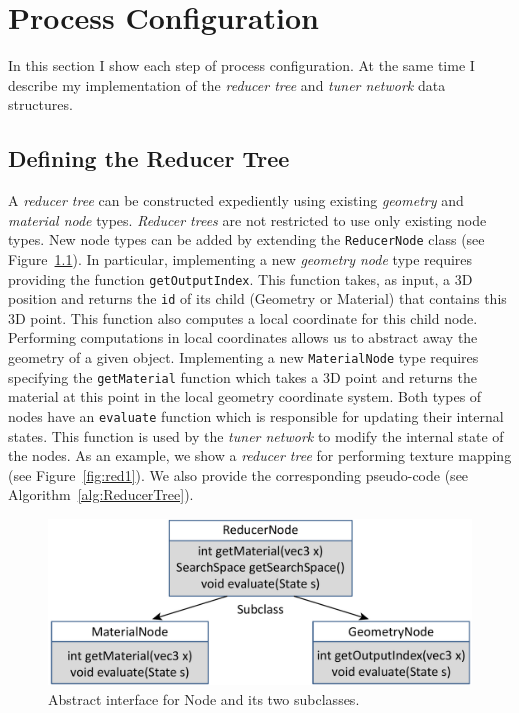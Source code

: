 \chapter{Process Configuration}
\label{sec:config}
In this section I show each step of process configuration. At the same time I describe my implementation of the 
\emph{reducer tree} and \emph{tuner network} data structures.

\section{Defining the Reducer Tree}
A \emph{reducer tree} can be constructed expediently using existing \emph{geometry} and \emph{material node} types.
\emph{Reducer trees} are not restricted to use only existing node types.
New node types can be added by extending the \verb|ReducerNode| class (see Figure~\ref{fig:node}).
In particular, implementing a new \emph{geometry node} type requires providing the function \verb|getOutputIndex|.
This function takes, as input, a 3D position and returns the \verb|id| of its child (Geometry or Material)
that contains this 3D point.
This function also computes a local coordinate for this child node.
Performing computations in local coordinates allows us to abstract away the geometry of a given object.
Implementing a new \verb|MaterialNode| type requires specifying the \verb|getMaterial| function
which takes a 3D point and returns the material at this point in the local geometry coordinate system.
Both types of nodes have an \verb|evaluate| function which is responsible for updating their internal states.
This function is used by the \emph{tuner network} to modify the internal state of the nodes.
As an example, we show a \emph{reducer tree} for performing texture mapping (see Figure~\ref{fig:red1}).
We also provide the corresponding pseudo-code (see Algorithm~\ref{alg:ReducerTree}).

\begin{figure}[h]
\centering
\includegraphics[width=0.6\linewidth]{figure/node.pdf}
\caption{Abstract interface for Node and its two subclasses.}
\label{fig:node}
\end{figure}

